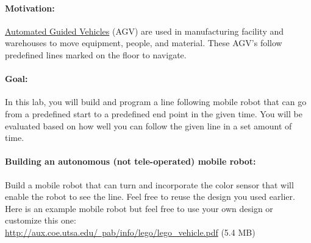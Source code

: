\documentclass[11pt]{article}
\def\bluehref#1#2{\href{#1}{\color{blue} #2}}
\begin{document}
\paragraph{Motivation:} \bluehref{https://en.wikipedia.org/wiki/Automated_guided_vehicle}{Automated Guided Vehicles} (AGV) are used in manufacturing facility and warehouses to move equipment, people, and material. These AGV's follow predefined lines marked on the floor to navigate. 

\paragraph{Goal:}
In this lab, you will build and program a line following mobile robot that can go from a predefined start to a predefined end point in the given time. You will be evaluated based on how well you can follow the given line in a set amount of time. 
 
%
\paragraph{Building an autonomous (not tele-operated) mobile robot:} Build a mobile robot that can turn and incorporate the color sensor that will enable the robot to see the line. Feel free to reuse the design you used earlier. Here is an example mobile robot but feel free to use your own design or customize this one: \\ \bluehref{http://aux.coe.utsa.edu/~pab/info/lego/lego\_vehicle.pdf}{http://aux.coe.utsa.edu/~pab/info/lego/lego\_vehicle.pdf} (5.4 MB)
\end{document}
